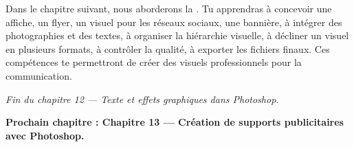 Dans le chapitre suivant, nous aborderons la . Tu apprendras à concevoir une affiche, un flyer, un visuel pour les réseaux sociaux, une bannière, à intégrer des photographies et des textes, à organiser la hiérarchie visuelle, à décliner un visuel en plusieurs formats, à contrôler la qualité, à exporter les fichiers finaux. Ces compétences te permettront de créer des visuels professionnels pour la communication.

\vspace{2em}

\begin{center}
\textit{Fin du chapitre 12 --- Texte et effets graphiques dans Photoshop.}

\vspace{1em}

\textbf{Prochain chapitre : Chapitre 13 --- Création de supports publicitaires avec Photoshop.}
\end{center}